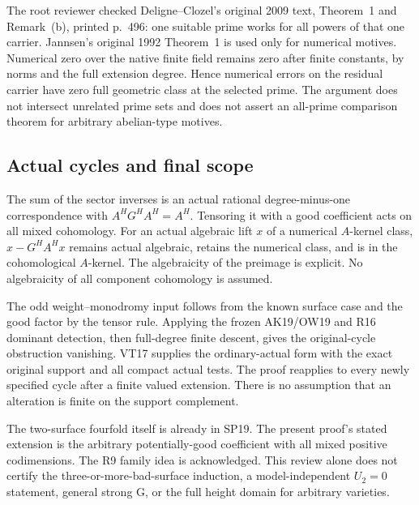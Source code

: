 The root reviewer checked Deligne--Clozel's original 2009 text,
Theorem~1 and Remark~(b), printed p.~496: one suitable prime works
for all powers of that one carrier.  Jannsen's original 1992
Theorem~1 is used only for numerical motives.  Numerical zero over
the native finite field remains zero after finite constants, by
norms and the full extension degree.  Hence numerical errors on
the residual carrier have zero full geometric class at the selected
prime.  The argument does not intersect unrelated prime sets and
does not assert an all-prime comparison theorem for arbitrary
abelian-type motives.

\subsection{Actual cycles and final scope}

The sum of the sector inverses is an actual rational
degree-minus-one correspondence with $A^H G^H A^H=A^H$.
Tensoring it with a good coefficient acts on all mixed cohomology.
For an actual algebraic lift $x$ of a numerical $A$-kernel class,
$x-G^HA^Hx$ remains actual algebraic, retains the numerical class,
and is in the cohomological $A$-kernel.  The algebraicity of the
preimage is explicit.  No algebraicity of all component cohomology
is assumed.

The odd weight--monodromy input follows from the known surface
case and the good factor by the tensor rule.  Applying the frozen
AK19/OW19 and R16 dominant detection, then full-degree finite
descent, gives the original-cycle obstruction vanishing.  VT17
supplies the ordinary-actual form with the exact original support
and all compact actual tests.  The proof reapplies to every newly
specified cycle after a finite valued extension.  There is no
assumption that an alteration is finite on the support complement.

The two-surface fourfold itself is already in SP19.  The present
proof's stated extension is the arbitrary potentially-good
coefficient with all mixed positive codimensions.  The R9 family
idea is acknowledged.  This review alone does not certify the
three-or-more-bad-surface induction, a model-independent $U_2=0$
statement, general strong G, or the full height domain for arbitrary
varieties.
